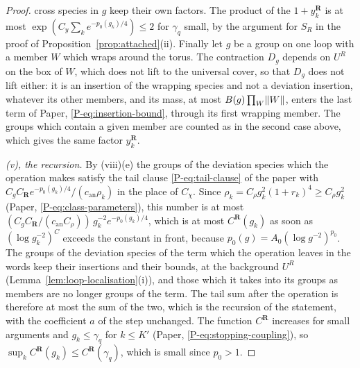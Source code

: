 \documentclass[11pt]{preprint}
\DeclarePairedDelimiter{\norm}{\lVert}{\rVert}
\numberwithin{equation}{section}
\theoremstyle{definition}
\theoremstyle{remark}
\theoremstyle{plain}
\begin{document}
\begin{proof}
cross species in $g$ keep their own factors. The product of the $1 + y^{\mathbf R}_k$ is at most $\exp(C_y\sum_ke^{-p_0(g_k)/4}) \leq 2$ for $\gamma_q$ small, by the argument for $S_R$ in the proof of Proposition~\ref{prop:attached}(ii). Finally let $g$ be a group on one loop with a member $W$ which wraps around the torus. The contraction $D_g$ depends on $U^R$ on the box of $W$, which does not lift to the universal cover, so that $D_g$ does not lift either: it is an insertion of the wrapping species and not a deviation insertion, whatever its other members, and its mass, at most $B(g)\prod_W\norm W$, enters the last term of Paper, \eqref{P-eq:insertion-bound}, through its first wrapping member. The groups which contain a given member are counted as in the second case above, which gives the same factor $y^{\mathbf R}_k$.

\emph{(v), the recursion.} By (viii)(e) the groups of the deviation species which the operation makes satisfy the tail clause \eqref{P-eq:tail-clause} of the paper with $C_gC_{\mathbf R}e^{-p_0(g_k)/4}/(c_{\mathrm{an}}\rho_k)$ in the place of $C_\chi$. Since $\rho_k = C_\rho g_k^2(1 + r_k)^4 \geq C_\rho g_k^2$ (Paper, \eqref{P-eq:class-parameters}), this number is at most $(C_gC_{\mathbf R}/(c_{\mathrm{an}}C_\rho))\,g_k^{-2}e^{-p_0(g_k)/4}$, which is at most $C^{\mathbf R}(g_k)$ as soon as $(\log g_k^{-2})^C$ exceeds the constant in front, because $p_0(g) = A_0(\log g^{-2})^{p_0}$. The groups of the deviation species of the term which the operation leaves in the words keep their insertions and their bounds, at the background $U^R$ (Lemma~\ref{lem:loop-localisation}(i)), and those which it takes into its groups as members are no longer groups of the term. The tail sum after the operation is therefore at most the sum of the two, which is the recursion of the statement, with the coefficient $a$ of the step unchanged. The function $C^{\mathbf R}$ increases for small arguments and $g_k \leq \gamma_q$ for $k \leq K'$ (Paper, \eqref{P-eq:stopping-coupling}), so $\sup_kC^{\mathbf R}(g_k) \leq C^{\mathbf R}(\gamma_q)$, which is small since $p_0 > 1$.


\end{proof}
\end{document}
